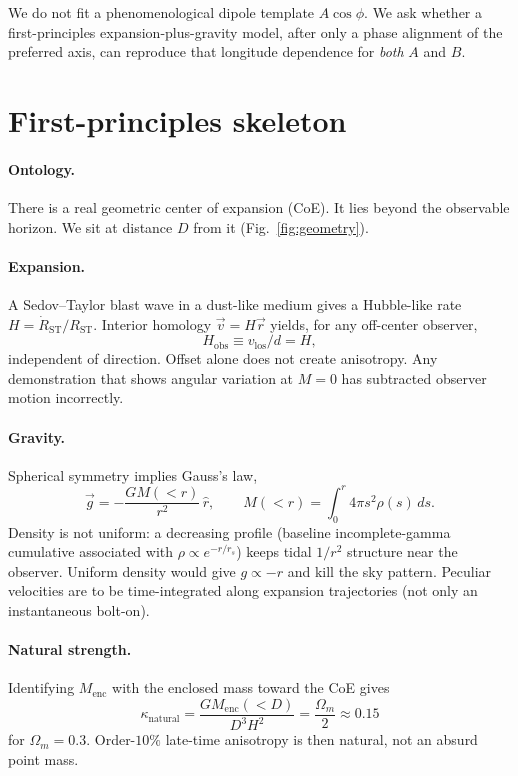 \documentclass[11pt,a4paper]{article}
\begin{document}
We do not fit a phenomenological dipole template \(A\cos\phi\). We ask whether a first-principles expansion-plus-gravity model, after only a phase alignment of the preferred axis, can reproduce that longitude dependence for \emph{both} \(A\) and \(B\).

\section{First-principles skeleton}

\paragraph{Ontology.}
There is a real geometric center of expansion (CoE). It lies beyond the observable horizon. We sit at distance \(D\) from it (Fig.~\ref{fig:geometry}).

\paragraph{Expansion.}
A Sedov--Taylor blast wave in a dust-like medium gives a Hubble-like rate \(H=\dot R_{\mathrm{ST}}/R_{\mathrm{ST}}\). Interior homology \(\vec v=H\vec r\) yields, for any off-center observer,
\[
H_{\mathrm{obs}}\equiv v_{\mathrm{los}}/d = H,
\]
independent of direction. Offset alone does not create anisotropy. Any demonstration that shows angular variation at \(M=0\) has subtracted observer motion incorrectly.

\paragraph{Gravity.}
Spherical symmetry implies Gauss's law,
\[
\vec g=-\frac{GM(<r)}{r^2}\,\hat r,\qquad
M(<r)=\int_0^r 4\pi s^2\rho(s)\,ds.
\]
Density is not uniform: a decreasing profile (baseline incomplete-gamma cumulative associated with \(\rho\propto e^{-r/r_s}\)) keeps tidal \(1/r^2\) structure near the observer. Uniform density would give \(g\propto -r\) and kill the sky pattern. Peculiar velocities are to be time-integrated along expansion trajectories (not only an instantaneous bolt-on).

\paragraph{Natural strength.}
Identifying \(M_{\mathrm{enc}}\) with the enclosed mass toward the CoE gives
\[
\kappa_{\mathrm{natural}}=\frac{GM_{\mathrm{enc}}(<D)}{D^3 H^2}=\frac{\Omega_m}{2}\approx 0.15
\]
for \(\Omega_m=0.3\). Order-\(10\%\) late-time anisotropy is then natural, not an absurd point mass.
\end{document}
